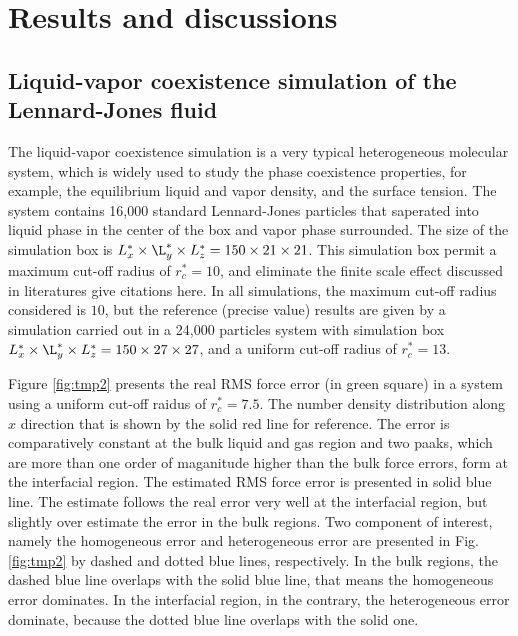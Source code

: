 \documentclass[aps,pre,preprint]{revtex4}
\newcommand{\recheck}[1]{{\color{red} #1}}
\begin{document}
\section{Results and discussions}

\subsection{Liquid-vapor coexistence simulation of the Lennard-Jones fluid}\label{sec:tmp2.1}

The liquid-vapor coexistence simulation is a very typical
heterogeneous molecular system, which is widely used to study the
phase coexistence properties, for example, the equilibrium liquid and
vapor density, and the surface tension. The system contains 16,000
standard Lennard-Jones particles that saperated into liquid phase in
the center of the box and vapor phase surrounded. The size of the
simulation box is $L_x^\ast \times \L_y^\ast \times L_z^\ast =
150\times 21\times 21$. This simulation box permit a maximum cut-off
radius of $r_c^\ast = 10$, and eliminate the finite scale effect
discussed in literatures \recheck {give citations here}. In all
simulations, the maximum cut-off radius considered is $10$, but the
reference (precise value) results are given by a simulation carried
out in a 24,000 particles system with simulation box $L_x^\ast \times
\L_y^\ast \times L_z^\ast = 150\times 27\times 27$, and a uniform
cut-off radius of $r_c^\ast = 13$.

Figure \ref{fig:tmp2} presents the real RMS force error (in green
square) in a system using a uniform cut-off raidus of $r_c^\ast =
7.5$. The number density distribution along $x$ direction that is
shown by the solid red line for reference.  The error is comparatively
constant at the bulk liquid and gas region and two paaks, which are
more than one order of maganitude higher than the bulk force errors,
form at the interfacial region.  The estimated RMS force error is
presented in solid blue line.  The estimate follows the real error
very well at the interfacial region, but slightly over estimate the
error in the bulk regions.  Two component of interest, namely the
homogeneous error and heterogeneous error are presented in
Fig. \ref{fig:tmp2} by dashed and dotted blue lines, respectively.  In
the bulk regions, the dashed blue line overlaps with the solid blue
line, that means the homogeneous error dominates.  In the interfacial
region, in the contrary, the heterogeneous error dominate, because the
dotted blue line overlaps with the solid one.
\end{document}
